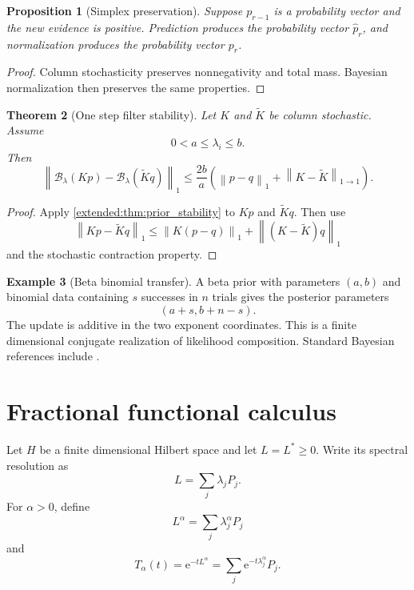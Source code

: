 \documentclass[11pt,a4paper]{article}
\newtheorem{theorem}{Theorem}[section]
\newtheorem{proposition}[theorem]{Proposition}
\theoremstyle{definition}
\newtheorem{example}[theorem]{Example}
\theoremstyle{remark}
\newcommand{\norm}[1]{\left\lVert#1\right\rVert}
\newcommand{\Bcal}{\mathcal B}
\newcommand{\e}{\mathrm e}
\begin{document}
\begin{proposition}[Simplex preservation]\label{extended:record:064}\label{extended:prop:hmm_preservation}
Suppose \(p_{r-1}\) is a probability vector and the new evidence is positive. Prediction produces the probability vector \(\widehat p_r\), and normalization produces the probability vector \(p_r\).
\end{proposition}

\begin{proof}
Column stochasticity preserves nonnegativity and total mass. Bayesian normalization then preserves the same properties.
\end{proof}

\begin{theorem}[One step filter stability]\label{extended:record:065}\label{extended:thm:hmm_stability}
Let \(K\) and \(\widetilde K\) be column stochastic. Assume
\[
0<a\leq\lambda_i\leq b.
\]
Then
\[
\norm{
\Bcal_\lambda(Kp)-\Bcal_\lambda(\widetilde Kq)
}_1
\leq
\frac{2b}{a}
\left(
\norm{p-q}_1
+
\norm{K-\widetilde K}_{1\to1}
\right).
\]
\end{theorem}

\begin{proof}
Apply \cref{extended:thm:prior_stability} to \(Kp\) and \(\widetilde Kq\). Then use
\[
\norm{Kp-\widetilde Kq}_1
\leq
\norm{K(p-q)}_1
+
\norm{(K-\widetilde K)q}_1
\]
and the stochastic contraction property.
\end{proof}

\begin{example}[Beta binomial transfer]\label{extended:record:066}
A beta prior with parameters \((a,b)\) and binomial data containing \(s\) successes in \(n\) trials gives the posterior parameters
\[
(a+s,b+n-s).
\]
The update is additive in the two exponent coordinates. This is a finite dimensional conjugate realization of likelihood composition. Standard Bayesian references include \cite{BernardoSmith1994}.
\end{example}

\section{Fractional functional calculus}\label{extended:section:11}\label{extended:sec:fractional}

Let \(H\) be a finite dimensional Hilbert space and let \(L=L^*\geq0\). Write its spectral resolution as
\[
L=\sum_j\lambda_jP_j.
\]
For \(\alpha>0\), define
\[
L^\alpha
=
\sum_j\lambda_j^\alpha P_j
\]
and
\[
T_\alpha(t)
=
\e^{-tL^\alpha}
=
\sum_j\e^{-t\lambda_j^\alpha}P_j.
\]
\end{document}
